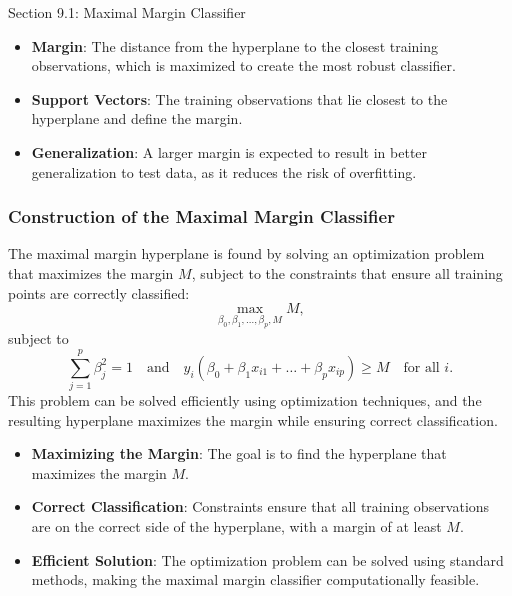 \begin{notes}{Section 9.1: Maximal Margin Classifier}
    \begin{highlight}
        \begin{itemize}
            \item \textbf{Margin}: The distance from the hyperplane to the closest training observations, which is maximized to create the most robust classifier.
            \item \textbf{Support Vectors}: The training observations that lie closest to the hyperplane and define the margin.
            \item \textbf{Generalization}: A larger margin is expected to result in better generalization to test data, as it reduces the risk of overfitting.
        \end{itemize}
    \end{highlight}
    
    \subsubsection*{Construction of the Maximal Margin Classifier}
    
    The maximal margin hyperplane is found by solving an optimization problem that maximizes the margin $M$, subject to the constraints that ensure all training points are correctly classified:
    \[
    \max_{\beta_0, \beta_1, \dots, \beta_p, M} M,
    \]
    subject to
    \[
    \sum_{j=1}^{p} \beta_j^2 = 1 \quad \text{and} \quad y_i (\beta_0 + \beta_1 x_{i1} + \dots + \beta_p x_{ip}) \geq M \quad \text{for all } i.
    \]
    This problem can be solved efficiently using optimization techniques, and the resulting hyperplane maximizes the margin while ensuring correct classification.
    
    \begin{highlight}
        \begin{itemize}
            \item \textbf{Maximizing the Margin}: The goal is to find the hyperplane that maximizes the margin $M$.
            \item \textbf{Correct Classification}: Constraints ensure that all training observations are on the correct side of the hyperplane, with a margin of at least $M$.
            \item \textbf{Efficient Solution}: The optimization problem can be solved using standard methods, making the maximal margin classifier computationally feasible.
        \end{itemize}
        \end{highlight}
    

\end{notes}
